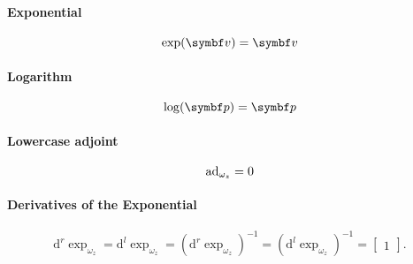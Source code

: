 \begin{properties}[breakable, title={$\En$ parameterized by $\mathbb{R}^{n}$}]
\paragraph{Exponential}
\begin{equation}
  \exp (\bv) = \bv
\end{equation}

\paragraph{Logarithm}
\begin{equation}
  \log (\bp) = \bp
\end{equation}

\paragraph{Lowercase adjoint}
\begin{equation}
  \operatorname{ad}_{\omega_z} = 0
\end{equation}

\paragraph{Derivatives of the Exponential}
\begin{equation}
  \mathrm{d}^r \exp_{\omega_z} =
  \mathrm{d}^l \exp_{\omega_z} =
  \left( \mathrm{d}^r \exp_{\omega_z} \right)^{-1} =
  \left( \mathrm{d}^l \exp_{\omega_z} \right)^{-1} = \begin{bmatrix} 1 \end{bmatrix}.
\end{equation}
\end{properties}

